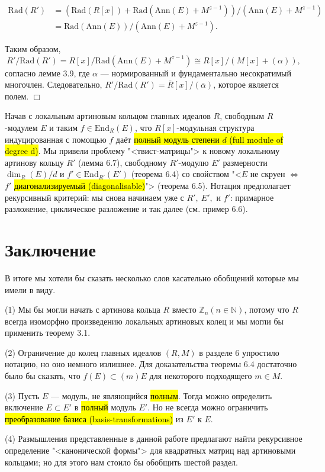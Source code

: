 \documentclass[a4paper,12pt]{article}
\newcommand{\Ann}{\text{Ann}}
\newcommand{\Endom}{\text{End}}
\newcommand{\Rad}{\text{Rad}}
\begin{document}
$$ \begin{aligned}
\Rad(R') &= (\Rad(R[x]) + \Rad(\Ann(E)+M^{z-1}))/(\Ann(E)+M^{z-1}) \\
		&= \Rad(\Ann(E)) / (\Ann(E)+M^{z-1}).
\end{aligned}$$

Таким образом,
$$
R' / \Rad(R') = R[x] / \Rad(\Ann(E)+M^{z-1}) \cong R[x] / (M[x] + (\alpha)),
$$
согласно лемме 3.9, где $\alpha$ --- нормированный и фундаментально несократимый многочлен. Следовательно, $R'/\Rad(R') = \overline{R}[x]/(\bar{\alpha})$, которое является полем. $\Box$

Начав с локальным артиновым кольцом главных идеалов $R$, свободным $R$-модулем $E$ и таким $f \in \Endom_R(E)$, что $R[x]$-модульная структура индуцированная с помощью $f$ даёт \hl{полный модуль степени $d$ (full module of degree d)}. Мы привели проблему "<твист-матрицы"> к новому локальному артинову кольцу $R'$ (лемма 6.7), свободному $R'$-модулю $E'$ размерности $\dim_R(E)/d$ и $f' \in \Endom_{R'}(E')$ (теорема 6.4) со свойством "<$E$ не скруен $\Leftrightarrow$ $f'$ \hl{диагонализируемый (diagonalisable)}"> (теорема 6.5). Нотация предполагает рекурсивный критерий: мы снова начинаем уже с $R',~E',$ и $f'$: примарное разложение, циклическое разложение и так далее (см. пример 6.6).


\section{Заключение}

В итоге мы хотели бы сказать несколько слов касательно обобщений которые мы имели в виду.

(1) Мы бы могли начать с артинова кольца $R$ вместо $\mathbb{Z}_n (n \in \mathbb{N})$, потому что $R$ всегда изоморфно произведению локальных артиновых колец и мы могли бы применить теорему 3.1.

(2) Ограничение до колец главных идеалов $(R, M)$ в разделе 6 упростило нотацию, но оно немного излишнее. Для доказательства теоремы 6.4 достаточно было бы сказать, что $f(E) \subset (m)E$ для некоторого подходящего $m \in M$.

(3) Пусть $E$ --- модуль, не являющийся \hl{полным}. Тогда можно определить включение $E \subset E'$ в \hl{полный} модуль $E'$. Но не всегда можно ограничить \hl{преобразование базиса (basis-transformations)} из $E'$ к $E$.

(4)
Размышления представленные в данной работе предлагают найти рекурсивное определение "<канонической формы"> для квадратных матриц над артиновыми кольцами; но для этого нам стоило бы обобщить шестой раздел. \\ \\
\end{document}
